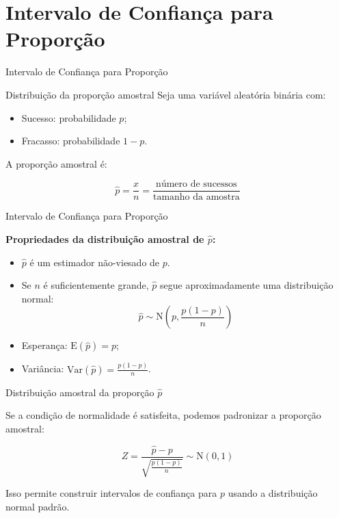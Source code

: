 \documentclass[14pt,aspectratio=1610]{beamer}
\begin{document}
	
	
	\section{Intervalo de Confiança para Proporção}
	
	\begin{frame}{Intervalo de Confiança para Proporção}
		\small
		\begin{block}{Distribuição da proporção amostral}
			\justifying
			Seja uma variável aleatória binária com:
			\begin{itemize}
				\item Sucesso: probabilidade $p$;
				\item Fracasso: probabilidade $1-p$.
			\end{itemize}
			
			A proporção amostral é:
			
			\[
			\hat{p} = \frac{x}{n} = \frac{\text{número de sucessos}}{\text{tamanho da amostra}}
			\]
			
			
		\end{block}
	\end{frame}
	
	\begin{frame}{Intervalo de Confiança para Proporção}
		\small
		\begin{block}{}
			
				
			\textbf{Propriedades da distribuição amostral de $\hat{p}$:}
			\begin{itemize}
				\justifying
				\item $\hat{p}$ é um estimador não-viesado de $p$.
				\item Se $n$ é suficientemente grande, $\hat{p}$ segue aproximadamente uma distribuição normal:
				\[
				\hat{p} \sim \text{N} \left( p, \frac{p(1-p)}{n} \right)
				\]
				\item Esperança: $\text{E}(\hat{p}) = p$;
				\item Variância: $\text{Var}(\hat{p}) = \frac{p(1-p)}{n}$.
			\end{itemize}
		\end{block}
	\end{frame}
	
	\begin{frame}{Distribuição amostral da proporção $\hat{p}$}
		\begin{block}{}
			\justifying
			Se a condição de normalidade é satisfeita, podemos padronizar a proporção amostral:
			
			\[
			Z = \frac{\hat{p} - p}{\sqrt{\frac{p(1-p)}{n}}} \sim \text{N}(0,1)
			\]
			
			Isso permite construir intervalos de confiança para $p$ usando a distribuição normal padrão.
		\end{block}
	\end{frame}
	
\end{document}
